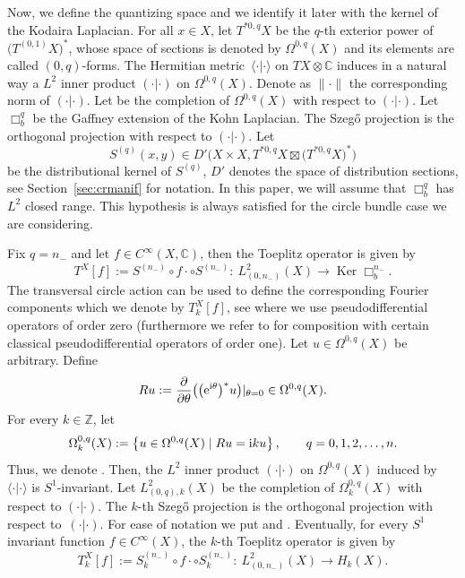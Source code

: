 \documentclass[10pt,a4paper]{amsart}
\numberwithin{equation}{section}
\newcommand{\pr}{\partial}
\newcommand{\set}[1]{\left\{#1\right\}}
\newcommand{\To}{\rightarrow}
\begin{document}
	Now, we define the quantizing space and we identify it later with the kernel of the Kodaira Laplacian. For all $x\in X$, let $T^{*0,q}X$ be the $q$-th exterior power of $\bigl(T^{(0,1)}X\bigr)^*$, whose space of sections is denoted by $\Omega^{0,q}(X)$ and its elements are called $(0,q)$-forms. The Hermitian metric~$\langle \cdot | \cdot \rangle$ on $TX\otimes \mathbb{C}$ induces in a natural way a $L^2$ inner product $( \cdot | \cdot )$ on $\Omega^{0,q}(X)$. Denote as $\lVert \cdot\rVert$ the corresponding norm of $( \cdot | \cdot )$. Let  be the completion of $\Omega^{0,q}(X)$ with respect to $( \cdot | \cdot )$. Let $\Box^q_b$ be the Gaffney extension of the Kohn Laplacian. The Szeg\H{o} projection is the orthogonal projection
\smash{$S^{(q)} \colon L^2_{(0,q)}(X)\To \operatorname{Ker}\Box^q_b$}
	with respect to $( \cdot | \cdot )$. Let
\[
S^{(q)}(x,y)\in {D}'\bigl(X\times X,T^{*0,q}X\boxtimes\bigl(T^{*0,q}X\bigr)^*\bigr)
\]
 be the distributional kernel of $S^{(q)}$, ${D}'$ denotes the space of distribution sections, see Section~\ref{sec:crmanif} for notation. In this paper, we will assume that $\Box^q_b$ has $L^2$ closed range. This hypothesis is always satisfied for the circle bundle case we are considering.
	
	Fix $q=n_-$ and let $f\in C^{\infty}(X, \mathbb{C})$, then the Toeplitz operator is given by
	\[T^X[f]:=S^{(n_-)}\circ f\cdot\circ S^{(n_-)}\colon\ L^2_{(0,n_-)}(X)\To\operatorname{Ker}\Box^{n_-}_b .
	\]
	The transversal circle action can be used to define the corresponding Fourier components which we denote by $T_k^X[f]$, see \cite{gh} where we use pseudodifferential operators of order zero (furthermore we refer to \cite{sh} for composition with certain classical pseudodifferential operators of order one). Let $u\in\Omega^{0,q}(X)$ be arbitrary. Define
	\[
	Ru:=\frac{\pr}{\pr\theta}\bigl(\bigl({\rm e}^{{\rm i}\theta}\bigr)^*u\bigr)|_{\theta=0}\in\Omega^{0,q}(X).
	\]
	For every $k\in\mathbb Z$, let
	\[
	\Omega^{0,q}_k(X):=\set{u\in\Omega^{0,q}(X)\mid Ru={\rm i}k u},\qquad q=0,1,2,\dots,n .\]
	Thus, we denote . Then, the $L^2$ inner product $( \cdot | \cdot )$ on $\Omega^{0,q}(X)$
	induced by~$\langle \cdot | \cdot \rangle$ is $S^1$-invariant. Let $L^2_{(0,q), k}(X)$ be
	the completion of $\Omega_k^{0,q}(X)$ with respect to $( \cdot | \cdot )$.
	The $k$-th Szeg\H{o} projection is the orthogonal projection
\smash{$S^{(q)}_{k}\colon L^2_{(0,q)}(X)\To \bigl(\operatorname{Ker}\Box^q_b\bigr)_k$}
	with respect to~$( \cdot | \cdot )$. For ease of notation we put
	 and .
	Eventually, for every $S^1$ invariant function $f\in{C}^\infty(X)$, the $k$-th Toeplitz operator is given by
	\[
		T_{k}^X[f]:=S^{(n_-)}_{k}\circ f\cdot\circ S^{(n_-)}_{k}\colon\ L^2_{(0,n_-)}(X)\To H_k(X) .
	\]
	
\end{document}
